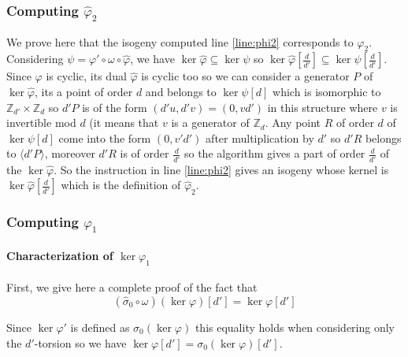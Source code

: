 \documentclass[12pt,a4paper]{article}
\begin{document}
			\subsubsection{Computing $\widehat\varphi_2$}

			We prove here that the isogeny computed line \ref{line:phi2} corresponds to $\varphi_2$.
			Considering $\psi=\varphi'\circ\omega\circ\widehat\varphi$, we have
			$\ker\widehat\varphi\subseteq\ker\psi$
			so  $\ker\widehat\varphi [\frac{d}{d'}]\subseteq \ker\psi[\frac{d}{d'}]$.
			Since $\varphi$ is cyclic, its dual $\widehat\varphi$ is cyclic too so we can consider a generator
			$P$ of $\ker\widehat\varphi$, its a point of order $d$ and belongs to $\ker\psi[d]$ which is
			isomorphic to $\mathbb Z_{d'} \times \mathbb Z_d$ so $d'P$ is of the form $(d'u,d'v)=(0,vd')$ in
			this structure where $v$ is invertible mod $d$ (it means that $v$ is a generator of $\mathbb Z_d$.
			Any point $R$ of order $d$ of $\ker\psi[d]$ come into the form $(0,v'd')$  after multiplication by
			$d'$ so  $d'R$ belongs to $\langle d'P\rangle$, moreover  $d'R$ is of order $\frac{d}{d'}$ so the
			algorithm gives a part of order $\frac{d}{d'}$ of the $\ker\widehat\varphi$.
			So the instruction in line \ref{line:phi2}	gives an isogeny whose kernel is
			$\ker\widehat\varphi[\frac{d}{d'}]$ which is the definition of $\widehat\varphi_2$.
			
			\subsubsection{Computing $\varphi_1$}

			\paragraph{Characterization of $\ker\varphi_1$}
			First, we give here a complete proof of the fact that \[
				(\widehat\sigma_0\circ\omega)(\ker\varphi)[d']=\ker\varphi[d']
			\] 

			Since $\ker\varphi'$ is defined as $\sigma_0(\ker\varphi)$ this equality holds when considering only
			the $d'$-torsion so we have $\ker\varphi[d']=\sigma_0(\ker\varphi)[d']$. 
\end{document}
